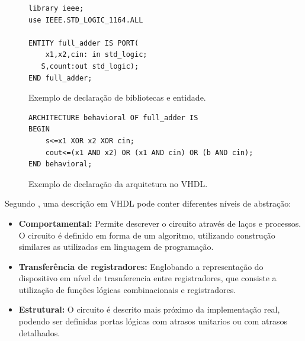 \begin{figure}[!htp]
\caption{\label{fig:biblioteca_entidade} Exemplo de declaração de bibliotecas e entidade.}
	\begin{center}
    \begin{minipage}{0.6\textwidth}
    \begin{lstlisting}       
library ieee;
use IEEE.STD_LOGIC_1164.ALL

ENTITY full_adder IS PORT(
	x1,x2,cin: in std_logic;
   S,count:out std_logic);
END full_adder;
\end{lstlisting}
    \end{minipage}
	\end{center}
\end{figure}

\begin{figure}[!htp]
\caption{\label{fig:arquitetura} Exemplo de declaração da arquitetura no VHDL.}
	\begin{center}
    \begin{minipage}{0.6\textwidth}
    \begin{lstlisting}       
ARCHITECTURE behavioral OF full_adder IS
BEGIN
	s<=x1 XOR x2 XOR cin;
    cout<=(x1 AND x2) OR (x1 AND cin) OR (b AND cin);
END behavioral;

\end{lstlisting}
    \end{minipage}
	\end{center}
\end{figure}



Segundo \cite{cappelattipraticando}, uma descrição em VHDL pode conter diferentes níveis de abstração:
\begin{itemize}
  \item \textbf{Comportamental:} Permite descrever o circuito através de laços e processos. O circuito é definido em forma de um algoritmo, utilizando construção similares as utilizadas em linguagem de programação.
  
  \item \textbf{Transferência de registradores:} Englobando a representação do dispositivo em nível de trasnferencia entre registradores, que consiste a utilização de funções lógicas combinacionais e registradores.
  
  \item \textbf{Estrutural:} O circuito é descrito mais próximo da implementação real, podendo ser definidas portas lógicas com atrasos unitarios ou com atrasos detalhados.
\end{itemize}

